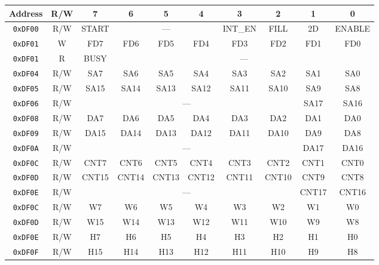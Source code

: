 \begin{table}[ht]
    \begin{center}
        \begin{tabular}{|c|c|c|c|c|c|c|c|c|c|} \hline
            Address & R/W & 7 & 6 & 5 & 4 & 3 & 2 & 1 & 0 \\\hline\hline
            \verb+0xDF00+ & R/W & START & \multicolumn{3}{|c|}{---} & INT\_EN & FILL & 2D & ENABLE \\ \hline
            \verb+0xDF01+ & W & FD7 & FD6 & FD5 & FD4 & FD3 & FD2 & FD1 & FD0 \\ \hline
            \verb+0xDF01+ & R & BUSY & \multicolumn{7}{|c|}{---}  \\ \hline\hline

            \verb+0xDF04+ & R/W & SA7 & SA6 & SA5 & SA4 & SA3 & SA2 & SA1 & SA0 \\ \hline
            \verb+0xDF05+ & R/W & SA15 & SA14 & SA13 & SA12 & SA11 & SA10 & SA9 & SA8 \\ \hline
            \verb+0xDF06+ & R/W & \multicolumn{6}{|c|}{---} & SA17 & SA16 \\ \hline\hline

            \verb+0xDF08+ & R/W & DA7 & DA6 & DA5 & DA4 & DA3 & DA2 & DA1 & DA0 \\ \hline
            \verb+0xDF09+ & R/W & DA15 & DA14 & DA13 & DA12 & DA11 & DA10 & DA9 & DA8 \\ \hline
            \verb+0xDF0A+ & R/W & \multicolumn{6}{|c|}{---} & DA17 & DA16 \\ \hline\hline

            \verb+0xDF0C+ & R/W & CNT7 & CNT6 & CNT5 & CNT4 & CNT3 & CNT2 & CNT1 & CNT0 \\ \hline
            \verb+0xDF0D+ & R/W & CNT15 & CNT14 & CNT13 & CNT12 & CNT11 & CNT10 & CNT9 & CNT8 \\ \hline
            \verb+0xDF0E+ & R/W & \multicolumn{6}{|c|}{---} & CNT17 & CNT16 \\ \hline\hline

            \verb+0xDF0C+ & R/W & W7 & W6 & W5 & W4 & W3 & W2 & W1 & W0 \\ \hline
            \verb+0xDF0D+ & R/W & W15 & W14 & W13 & W12 & W11 & W10 & W9 & W8 \\ \hline
            \verb+0xDF0E+ & R/W & H7 & H6 & H5 & H4 & H3 & H2 & H1 & H0 \\ \hline
            \verb+0xDF0F+ & R/W & H15 & H14 & H13 & H12 & H11 & H10 & H9 & H8 \\ \hline\hline


\end{tabular}
\end{center}
\end{table}
